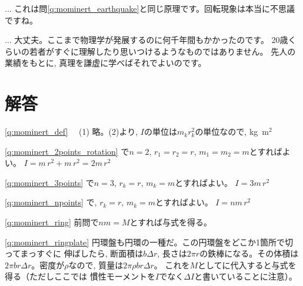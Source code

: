 \begin{q}
\begin{faq}{\small{} ... 
これは問\ref{q:mominert_earthquake}と同じ原理です。回転現象は本当に不思議ですね。}\end{faq}

\begin{faq}{\small{}
 ... 大丈夫。ここまで物理学が発展するのに何千年間もかかったのです。
20歳くらいの若者がすぐに理解したり思いつけるようなものではありません。
先人の業績をもとに, 真理を謙虚に学べばそれでよいのです。
}\end{faq}
\hv

\section{解答}
\ref{q:mominert_def}　
(1) 略。(2)より, $I$の単位は$m_kr_k^2$の単位なので, kg~m$^2$
\mv

\ref{q:mominert_2points_rotation}
で$n=2$, $r_1=r_2=r$, $m_1=m_2=m$とすればよい。
$I=m\,r^2+m^{\,}r^2=2m^{\,}r^2$

\ref{q:mominert_3points}
で$n=3$, $r_k=r$, $m_k=m$とすればよい。
$I=3m\,r^2$

\ref{q:mominert_npoints}
で, $r_k=r$, $m_k=m$とすればよい。
$I=nm\,r^2$

\ref{q:mominert_ring}
前問で$nm=M$とすれば与式を得る。\mv

\ref{q:mominert_ringplate}
円環盤も円環の一種だ。この円環盤をどこか1箇所で切ってまっすぐに
伸ばしたら, 断面積は$b\Delta r$, 長さは$2\pi r$の鉄棒になる。その体積は
$2\pi br \Delta r$。密度が$\rho$なので, 質量は$2\pi\rho br \Delta r$。
これを$M$としてに代入すると与式を得る（ただしここでは
慣性モーメントを$I$でなく$\Delta I$と書いていることに注意）。\mv


\end{q}
